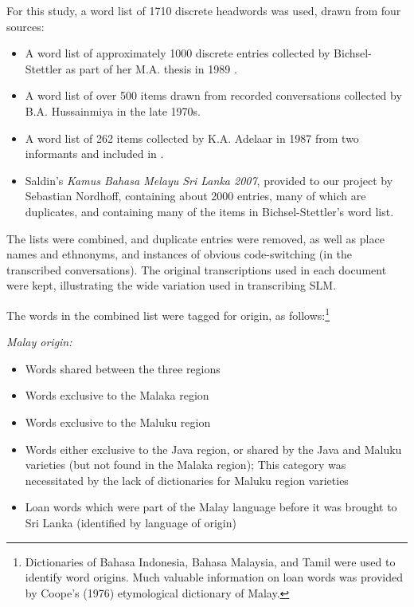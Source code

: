 For this study, a word list of 1710 discrete headwords was used, drawn from four sources:

\begin{itemize}
\item A word list of approximately 1000 discrete entries collected by Bichsel-Stettler as part of her M.A. thesis in 1989 \citep{Bichsel1989}.

\item A word list of over 500 items drawn from recorded conversations collected by B.A. Hussainmiya in the late 1970s.

\item A word list of 262 items collected by K.A. Adelaar in 1987 from two informants and included in \citet{Adelaar1991}.

\item Saldin's \nocite{Saldin2007} \textit{Kamus Bahasa Melayu Sri Lanka 2007}, provided to our project by Sebastian Nordhoff, containing about 2000 entries, many of which are duplicates, and containing many of the items in Bichsel-Stettler's word list.
\end{itemize}

The lists were combined, and duplicate entries were removed, as well as place names and ethnonyms, and instances of obvious code-switching (in the transcribed conversations). The original transcriptions used in each document were kept, illustrating the wide variation used in transcribing SLM.

The words in the combined list were tagged for origin, as follows:\footnote{Dictionaries
 of Bahasa Indonesia, Bahasa Malaysia, and Tamil were used to identify word origins. Much valuable information on loan words was provided by Coope's (1976) \nocite{Coope1976} etymological dictionary of Malay.}

\textit{Malay origin:}
\begin{itemize}
\item Words shared between the three regions

\item Words exclusive to the Malaka region	

\item Words exclusive to the Maluku region

\item Words either exclusive to the Java region, or shared by the Java and Maluku varieties (but not found in the Malaka region); This category was necessitated by the lack of dictionaries for Maluku region varieties

\item Loan words which were part of the Malay language before it was brought to Sri Lanka (identified by language of origin)

\end{itemize}

